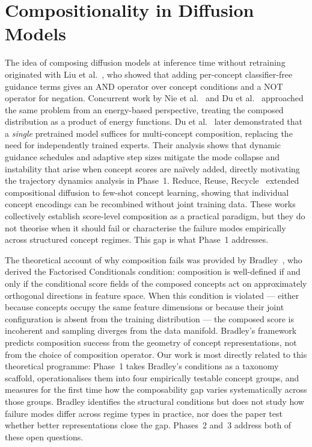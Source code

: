 
\section{Compositionality in Diffusion Models}
\label{sec:rw_compositional}

The idea of composing diffusion models at inference time without retraining originated
with Liu et al.~\citep{liu2022compositional}, who showed that adding per-concept
classifier-free guidance terms gives an AND operator over concept conditions and a NOT
operator for negation. Concurrent work by Nie et al.~\citep{nie2021controllable} and
Du et al.~\citep{NEURIPS2020_49856ed4} approached the same problem from an
energy-based perspective, treating the composed distribution as a product of energy
functions. Du et al.~\citep{du2024compositional} later demonstrated that a
\emph{single} pretrained model suffices for multi-concept composition, replacing the
need for independently trained experts. Their analysis shows that dynamic guidance
schedules and adaptive step sizes mitigate the mode collapse and instability that
arise when concept scores are na\"{i}vely added, directly motivating the trajectory
dynamics analysis in Phase~1. Reduce, Reuse, Recycle~\citep{reduce_reuse_recycle_icml2023}
extended compositional diffusion to few-shot concept learning, showing that individual
concept encodings can be recombined without joint training data. These works collectively
establish score-level composition as a practical paradigm, but they do not theorise when
it should fail or characterise the failure modes empirically across structured concept
regimes. This gap is what Phase~1 addresses.

The theoretical account of why composition fails was provided by
Bradley~\citep{mechanisms2025projective}, who derived the Factorised Conditionals
condition: composition is well-defined if and only if the conditional score fields of the
composed concepts act on approximately orthogonal directions in feature space. When this
condition is violated --- either because concepts occupy the same feature dimensions or
because their joint configuration is absent from the training distribution --- the
composed score is incoherent and sampling diverges from the data manifold. Bradley's
framework predicts composition success from the geometry of concept representations,
not from the choice of composition operator. Our work is most directly related to this
theoretical programme: Phase~1 takes Bradley's conditions as a taxonomy scaffold,
operationalises them into four empirically testable concept groups, and measures for the
first time how the composability gap varies systematically across those groups. Bradley
identifies the structural conditions but does not study how failure modes differ across
regime types in practice, nor does the paper test whether better representations close
the gap. Phases~2 and~3 address both of these open questions.

